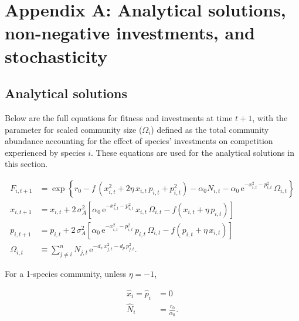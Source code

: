 
\renewcommand{\thefigure}{A\arabic{figure}}
\renewcommand{\theequation}{A\arabic{equation}}
\renewcommand{\thetable}{A\arabic{table}}
\setcounter{equation}{0}
\setcounter{figure}{0}
\setcounter{table}{0}


\section*{Appendix A: Analytical solutions, non-negative investments, and stochasticity}



\subsection*{Analytical solutions}

Below are the full equations for fitness and investments at time $t+1$, with
the parameter for scaled community size ($\Omega_i$) defined as the 
total community abundance accounting for the effect of species' investments 
on competition experienced by species $i$.
These equations are used for the analytical solutions in this section.

\begin{equation}
\label{eq:analytical-equations}
\begin{split}
    F_{i,t+1} &= \exp\left\{
        r_0 - f \, \left( x_{i,t}^2 + 2 \eta \, x_{i,t} \, p_{i,t} + p_{i,t}^2 \right)
        - \alpha_0 N_{i,t} - \alpha_0 \, \text{e}^{-x_{i,t}^2 - p_{i,t}^2} \, \Omega_{i,t}
        \right\} \\
    x_{i,t+1} &= x_{i,t} + 2 \, \sigma_A^2 \left[
            \alpha_0 \, \text{e}^{-x_{i,t}^2 - p_{i,t}^2} \, x_{i,t} \,
            \Omega_{i,t}
            - f \left( x_{i,t} + \eta \, p_{i,t} \right) 
        \right]\\
    p_{i,t+1} &= p_{i,t} + 2 \, \sigma_A^2 \left[
            \alpha_0 \, \text{e}^{-x_{i,t}^2 - p_{i,t}^2} \, p_{i,t} \,
            \Omega_{i,t}
            - f \left( p_{i,t} + \eta \, x_{i,t} \right) 
        \right] \\
    \Omega_{i,t} &\equiv \sum_{j \ne i}^{n}{ N_{j,t} \, \text{e}^{ 
                -d_x \, x_{j,t}^2 - d_p \, p_{j,t}^2 } }
    \text{.}
\end{split}
\end{equation}

For a 1-species community, unless $\eta = -1$,

\begin{equation}
\label{eq:analytical-1spp-solns}
\begin{split}
    \hat{x}_{i} = \hat{p}_{i} &= 0 \\
    \hat{N}_i &= \frac{r_0}{\alpha_0}
    \text{.}
\end{split}
\end{equation}

